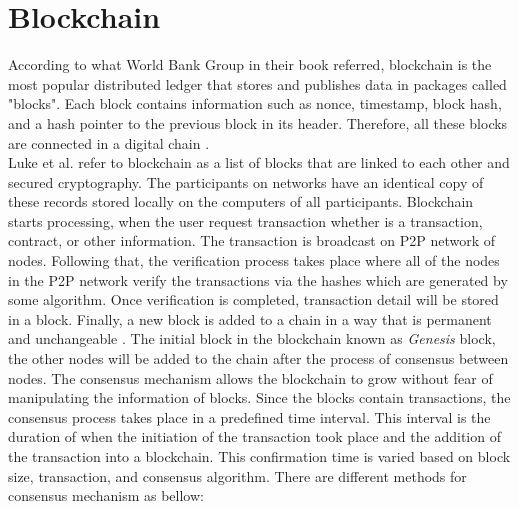 \section{Blockchain} According to what World Bank Group \cite{DLT} in their book referred, blockchain is the most popular distributed ledger that stores and publishes data in packages called "blocks". Each block contains information such as nonce, timestamp, block hash, and a hash pointer to the previous block in its header. Therefore, all these blocks are connected in a digital chain \cite{DLT}. \\
Luke et al.\cite{Luke} refer to blockchain as a list of blocks that are linked to each other and secured cryptography. The participants on networks have an identical copy of these records stored locally on the computers of all participants. Blockchain starts processing, when the user request transaction whether is a transaction, contract, or other information. The transaction is broadcast on P2P network of nodes. Following that, the verification process takes place where all of the nodes in the P2P network verify the transactions via the hashes which are generated by some algorithm. Once verification is completed, transaction detail will be stored in a block. Finally, a new block is added to a chain in a way that is permanent and unchangeable \cite{Luke}. The initial block in the blockchain known as \textit{Genesis} block, the other nodes will be added to the chain after the process of consensus between nodes. The consensus mechanism allows the blockchain to grow without fear of manipulating the information of blocks. Since the blocks contain transactions, the consensus process takes place in a predefined time interval. This interval is the duration of when the initiation of the transaction took place and the addition of the transaction into a blockchain. This confirmation time is varied based on block size, transaction, and consensus algorithm. There are different methods for consensus mechanism as bellow: 
